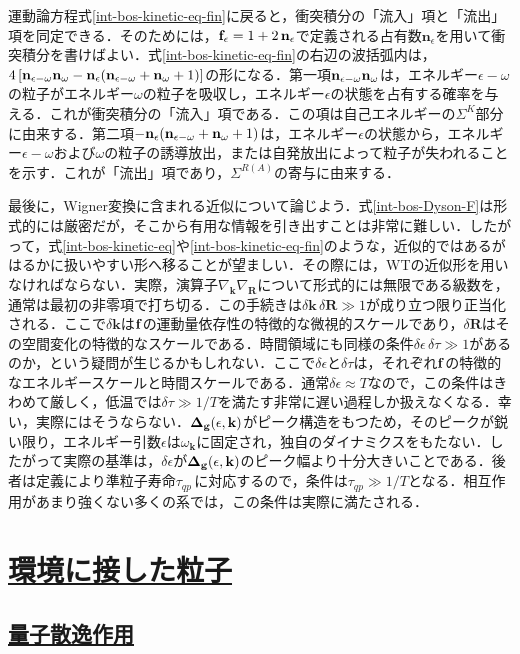 \documentclass[a4paper,11pt]{ltjsarticle}
\newcommand{\sectionlink}[1]{\section[#1]{\hyperlink{toc}{#1}}}
\newcommand{\subsectionlink}[1]{\subsection[#1]{\hyperlink{toc}{#1}}}
\begin{document}
運動論方程式\eqref{int-bos-kinetic-eq-fin}に戻ると，衝突積分の「流入」項と「流出」項を同定できる．そのためには，${\bf
f}_{\epsilon}=1+2\,{\bf n}_{\epsilon}$で定義される占有数$\mathbf{n}_{\epsilon}$を用いて衝突積分を書けばよい．式\eqref{int-bos-kinetic-eq-fin}の右辺の波括弧内は，$4\left[{\bf n}_{\epsilon-\omega}{\bf n}_\omega- {\bf
n}_\epsilon({\bf n}_{\epsilon-\omega}+{\bf n}_\omega+1)\right]$の形になる．第一項${\bf n}_{\epsilon-\omega}{\bf n}_\omega$は，エネルギー$\epsilon-\omega$の粒子がエネルギー$\omega$の粒子を吸収し，エネルギー$\epsilon$の状態を占有する確率を与える．これが衝突積分の「流入」項である．この項は自己エネルギーの$\Sigma^K$部分に由来する．第二項$ -{\bf n}_\epsilon({\bf n}_{\epsilon-\omega}+{\bf
n}_\omega+1)$は，エネルギー$\epsilon$の状態から，エネルギー$\epsilon-\omega$および$\omega$の粒子の誘導放出，または自発放出によって粒子が失われることを示す．これが「流出」項であり，$\Sigma^{R(A)}$の寄与に由来する．


最後に，Wigner変換に含まれる近似について論じよう．式\eqref{int-bos-Dyson-F}は形式的には厳密だが，そこから有用な情報を引き出すことは非常に難しい．したがって，式\eqref{int-bos-kinetic-eq}や\eqref{int-bos-kinetic-eq-fin}のような，近似的ではあるがはるかに扱いやすい形へ移ることが望ましい．その際には，WTの近似形を用いなければならない．実際，演算子$\nabla_\mathbf{k}\nabla_{\mathbf{R}}$について形式的には無限である級数を，通常は最初の非零項で打ち切る．この手続きは$\delta \mathbf{k}\,\delta \mathbf{R}\gg 1$が成り立つ限り正当化される．ここで$\delta \mathbf{k}$は${\bf f}$の運動量依存性の特徴的な微視的スケールであり，$\delta\mathbf{R}$はその空間変化の特徴的なスケールである．時間領域にも同様の条件$\delta\epsilon\,
\delta \tau\gg 1$があるのか，という疑問が生じるかもしれない．ここで$\delta\epsilon$と$\delta \tau$は，それぞれ${\bf f}$の特徴的なエネルギースケールと時間スケールである．通常$\delta\epsilon \approx T$なので，この条件はきわめて厳しく，低温では$\delta\tau \gg
1/T$を満たす非常に遅い過程しか扱えなくなる．幸い，実際にはそうならない．${\bf \Delta_g}(\epsilon,\mathbf{k})$がピーク構造をもつため，そのピークが鋭い限り，エネルギー引数$\epsilon$は$\omega_\mathbf{k}$に固定され，独自のダイナミクスをもたない．したがって実際の基準は，$\delta\epsilon$が${\bf \Delta_g}(\epsilon,\mathbf{k})$のピーク幅より十分大きいことである．後者は定義により準粒子寿命$\tau_{qp}\,$に対応するので，条件は$\tau_{qp}\gg 1/T$となる．相互作用があまり強くない多くの系では，この条件は実際に満たされる．


\sectionlink{環境に接した粒子}\label{sec_environment}
\subsectionlink{量子散逸作用}\label{sec_environment-1}
\end{document}
